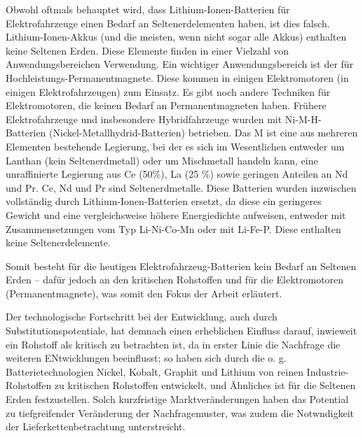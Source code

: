 \documentclass[12pt,a4paper,oneside]{book} %
\begin{document}
{{Obwohl oftmals behauptet wird, dass Lithium-Ionen-Batterien für Elektrofahrzeuge einen Bedarf an Seltenerdelementen haben, ist dies falsch. Lithium-Ionen-Akkus (und die meisten, wenn nicht sogar alle Akkus) enthalten keine Seltenen Erden. Diese Elemente finden in einer Vielzahl von Anwendungsbereichen Verwendung. Ein wichtiger Anwendungsbereich ist der für Hochleistungs-Permanentmagnete. Diese kommen in einigen Elektromotoren (in einigen Elektrofahrzeugen) zum Einsatz. Es gibt noch andere Techniken für Elektromotoren, die keinen Bedarf an Permanentmagneten haben. 
 Frühere Elektrofahrzeuge und insbesondere Hybridfahrzeuge wurden mit Ni-M-H-Batterien (Nickel-Metallhydrid-Batterien) betrieben. Das M ist eine aus mehreren Elementen bestehende Legierung, bei der es sich im Wesentlichen entweder um Lanthan (kein Seltenerdmetall) oder um Mischmetall handeln kann, eine unraffinierte Legierung aus Ce (50\%), La (25 \%) sowie geringen Anteilen an Nd und Pr. Ce, Nd und Pr sind Seltenerdmetalle. Diese Batterien wurden inzwischen vollständig durch Lithium-Ionen-Batterien ersetzt, da diese ein geringeres Gewicht und eine vergleichsweise höhere Energiedichte aufweisen, entweder mit Zusammensetzungen vom Typ Li-Ni-Co-Mn oder mit Li-Fe-P. Diese enthalten keine Seltenerdelemente.
 
  Somit besteht für die heutigen Elektrofahrzeug-Batterien kein Bedarf an Seltenen Erden -- dafür jedoch an den kritischen Rohstoffen und für die Elektromotoren (Permanentmagnete), was somit den Fokus der Arbeit erläutert.
 
 Der technologische Fortschritt bei der Entwicklung, auch durch Substitutionspotentiale, hat demnach einen erheblichen Einfluss darauf, inwieweit ein Rohstoff als kritisch zu betrachten ist, da in erster Linie die Nachfrage die weiteren ENtwicklungen beeinflusst; so haben sich durch die o. g. Batterietechnologien Nickel, Kobalt, Graphit und Lithium von reinen Industrie-Rohstoffen zu kritischen Rohstoffen entwickelt, und Ähnliches ist für die Seltenen Erden festzustellen. Solch kurzfristige Marktveränderungen haben das Potential zu tiefgreifender Veränderung der Nachfragemuster, was zudem die Notwndigkeit der Lieferkettenbetrachtung unterstreicht.\autocite{Resilience of Critical Minerals Supply Chain, S. 9}
 
}}
\end{document}
